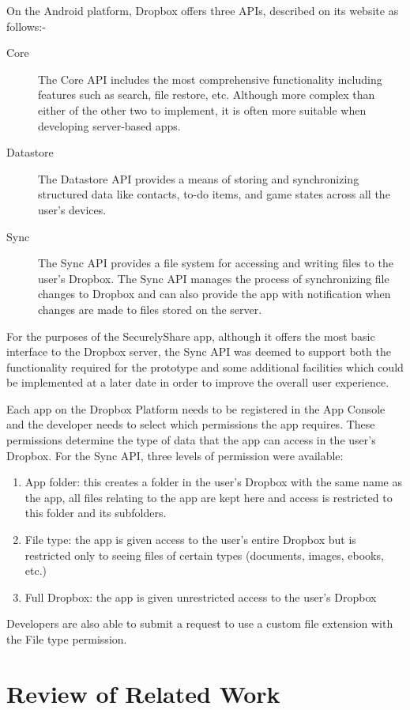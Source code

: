 On the Android platform, Dropbox offers three APIs, described on its website as follows:-
\begin{description}
	\item[Core]The Core API includes the most comprehensive functionality including features such as search, file restore, etc. Although more complex than either of the other two to implement, it is often more suitable when developing server-based apps.
	\item[Datastore]The Datastore API provides a means of storing and synchronizing structured data like contacts, to-do items, and game states across  all the user's devices.
	\item[Sync]The Sync API provides a file system for accessing and writing files to the user's Dropbox.  The Sync API manages the process of synchronizing file changes to Dropbox and can also provide the app with notification when changes are made to files stored on the server.
\end{description}

For the purposes of the SecurelyShare app, although it offers the most basic interface to the Dropbox server, the Sync API was deemed to support both the functionality required for the prototype and some additional facilities which could be implemented at a later date in order to improve the overall user experience.

Each app on the Dropbox Platform needs to be registered in the App Console and the developer needs to select which permissions the app requires. These permissions determine the type of data that the app can access in the user's Dropbox.  For the Sync API, three levels of permission were available:
\begin{enumerate}
\item App folder:  this creates a folder in the user's Dropbox with the same name as the app, all files relating to the app are kept here and access is restricted to this folder and its subfolders.
\item File type: the app is given access to the user's entire Dropbox but is restricted only to seeing files of certain types (documents, images, ebooks, etc.)  
\item Full Dropbox:  the app is given unrestricted access to the user's Dropbox
\end{enumerate}
Developers are also able to submit a request to use a custom file extension with the File type permission.


\section{Review of Related Work }
\label{sec:agke}
\\

